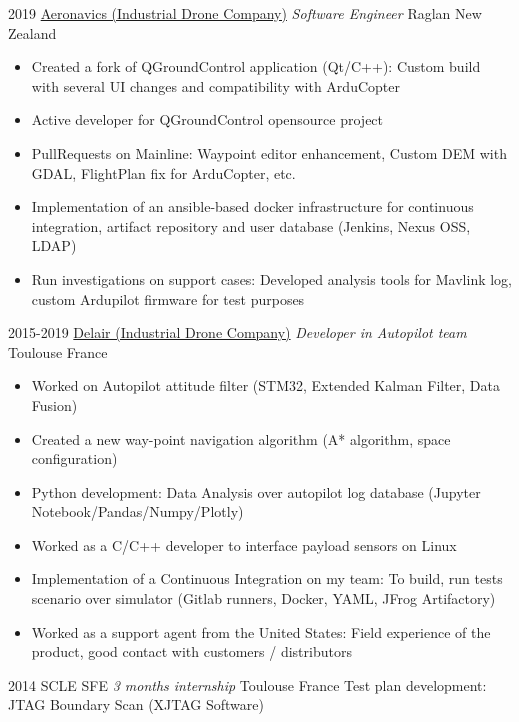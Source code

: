 \documentclass[a4paper]{friggeri-cv} %
\begin{document}
\begin{entrylist}
\entry
{2019}
{\href{https://aeronavics.com}{Aeronavics (Industrial Drone Company)} \textit{ Software Engineer}}
{Raglan New Zealand}
{
\begin{itemize}
    \item Created a fork of QGroundControl application (Qt/C++): Custom build with several UI changes and compatibility with ArduCopter
    \item Active developer for QGroundControl opensource project
    \item PullRequests on Mainline: Waypoint editor enhancement, Custom DEM with GDAL, FlightPlan fix for ArduCopter, etc.  
    \item Implementation of an ansible-based docker infrastructure for continuous integration, artifact repository and user database (Jenkins, Nexus OSS, LDAP)
    \item Run investigations on support cases: Developed analysis tools for Mavlink log, custom Ardupilot firmware for test purposes
\end{itemize}
%
}
\entry
{2015-2019}
{\href{https://delair.aero}{Delair (Industrial Drone Company)} \textit{ Developer in Autopilot team}}
{Toulouse France}
{
\begin{itemize}
\item Worked on Autopilot attitude filter (STM32, Extended Kalman Filter, Data Fusion)
\item Created a new way-point navigation algorithm (A* algorithm, space configuration)
\item Python development: Data Analysis over autopilot log database (Jupyter Notebook/Pandas/Numpy/Plotly)%
\item Worked as a C/C++ developer to interface payload sensors on Linux%
\item Implementation of a Continuous Integration on my team: To build, run tests scenario over simulator (Gitlab runners, Docker, YAML, JFrog Artifactory) 
\item Worked as a support agent from the United States: Field experience of the
	product, good contact with customers / distributors
\end{itemize}
%
}
\entry
{2014}
{SCLE SFE \textit{3 months internship}}
{Toulouse France}
{Test plan development: JTAG Boundary Scan (XJTAG Software)
}


\end{entrylist}
\end{document}
